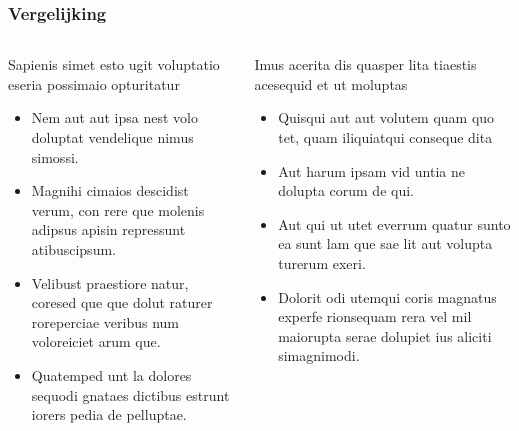 \documentclass[xcolor=table,10pt,t]{beamer}
\begin{document}
\begin{frame}
    \frametitle{Vergelijking}
        
    \begin{columns}[T,totalwidth=\linewidth]
        \begin{column}{0.475\textwidth}
            \begin{block}{Sapienis simet esto ugit voluptatio eseria possimaio opturitatur}
                \begin{itemize}
                    \item Nem aut aut ipsa nest volo doluptat vendelique nimus simossi.
                    \item Magnihi cimaios descidist verum, con rere que molenis adipsus apisin repressunt atibuscipsum.
                    \item Velibust praestiore natur, coresed que que dolut raturer roreperciae veribus num voloreiciet arum que.
                    \item Quatemped unt la dolores sequodi gnataes dictibus estrunt iorers pedia de pelluptae.
                \end{itemize}
            \end{block}
        \end{column}
        \begin{column}{0.475\textwidth}
            \begin{block}{Imus acerita dis quasper lita tiaestis acesequid et ut moluptas}
                \begin{itemize}
                    \item Quisqui aut aut volutem quam quo tet, quam iliquiatqui conseque dita
                    \item Aut harum ipsam vid untia ne dolupta corum de qui.
                    \item Aut qui ut utet everrum quatur sunto ea sunt lam que sae lit aut volupta turerum exeri.
                    \item Dolorit odi utemqui coris magnatus experfe rionsequam rera vel mil maiorupta serae dolupiet ius aliciti simagnimodi.
                \end{itemize}
            \end{block}
        \end{column}
    \end{columns}
\end{frame}
\end{document}
